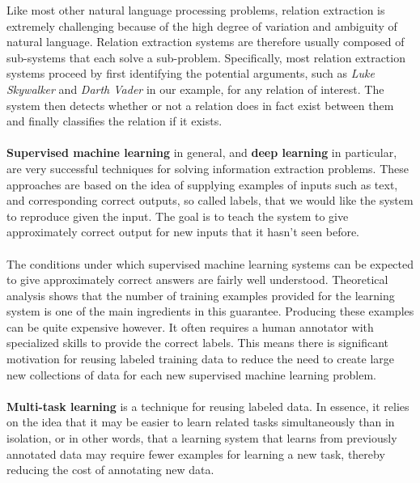 Like most other natural language processing problems, relation extraction is extremely challenging because of the high degree of variation and ambiguity of natural language. Relation extraction systems are therefore usually composed of sub-systems that each solve a sub-problem. Specifically, most relation extraction systems proceed by first identifying the potential arguments, such as \textit{Luke Skywalker} and \textit{Darth Vader} in our example, for any relation of interest. The system then detects whether or not a relation does in fact exist between them and finally classifies the relation if it exists.
\\\\
\textbf{Supervised machine learning} in general, and \textbf{deep learning} in particular, are very successful techniques for solving information extraction problems. These approaches are based on the idea of supplying examples of inputs such as text, and corresponding correct outputs, so called labels, that we would like the system to reproduce given the input. The goal is to teach the system to give approximately correct output for new inputs that it hasn't seen before.
\\\\
The conditions under which supervised machine learning systems can be expected to give approximately correct answers are fairly well understood. Theoretical analysis shows that the number of training examples provided for the learning system is one of the main ingredients in this guarantee. Producing these examples can be quite expensive however. It often requires a human annotator with specialized skills to provide the correct labels. This means there is significant motivation for reusing labeled training data to reduce the need to create large new collections of data for each new supervised machine learning problem.
\\\\
\textbf{Multi-task learning} is a technique for reusing labeled data. In essence, it relies on the idea that it may be easier to learn related tasks simultaneously than in isolation, or in other words, that a learning system that learns from previously annotated data may require fewer examples for learning a new task, thereby reducing the cost of annotating new data.